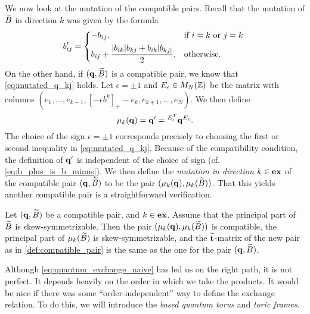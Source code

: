We now look at the mutation of the compatible pairs. Recall that the mutation of $\widetilde{B}$
in direction $k$ was given by the formula
\begin{equation*}
	b'_{ij} = \begin{dcases*}
		-b_{ij},                                            & if $i = k$ or $j = k$ \\
		b_{ij} + \frac{|b_{ik}|b_{kj} + b_{ik}|b_{kj|}}{2}, & otherwise.
	\end{dcases*}
\end{equation*}
%
On the other hand, if $(\mathbf{q}, \widetilde{B})$ is a compatible pair, we know that
\cref{eq:mutated_q_kj} holds. Let $\epsilon = \pm 1$ and $E_{\epsilon} \in M_N(\mathbb{Z})$
be the matrix with columns $(e_1, \dots, e_{k-1}, [-\epsilon b^k]_{+} - e_k, e_{k+1},
	\dots, e_N)$. We then define
\begin{equation}\label{eq:def_mutation_q}
	\mu_k(\mathbf{q}) = \mathbf{q}' = \prescript{E_{\epsilon}^T}{}{}\mathbf{q}^{E_\epsilon}.
\end{equation}
%
The choice of the sign $\epsilon = \pm 1$ corresponds precisely to choosing the first
or second inequality in \cref{eq:mutated_q_kj}. Because of the compatibility condition,
the definition of $\mathbf{q}'$ is independent of the choice of sign (cf.
\cref{eq:b_plus_is_b_minus}). We then define the \emph{mutation in direction $k \in
		\mathbf{ex}$} of the compatible pair $(\mathbf{q}, \widetilde{B})$ to be
the pair $(\mu_k (\mathbf{q}),\mu_k (\widetilde{B}) )$. That this yields another compatible pair is a
straightforward verification.
\begin{proposition}\label{prop:mutation_preserves_good_things}

	Let $(\mathbf{q}, \widetilde{B})$ be a compatible pair, and $k \in \mathbf{ex}$. Assume that the principal part
	of $\widetilde{B}$ is skew-symmetrizable. Then the pair $(\mu_k (\mathbf{q}), \mu_k(\widetilde{B}))$ is
	compatible, the principal part of $\mu_k(\widetilde{B})$ is skew-symmetrizable, and the
	$\widetilde{\mathbf{t}}$-matrix of the new pair as in \cref{def:compatible_pair} is the same as the
	one for the pair $(\mathbf{q}, \widetilde{B})$.
\end{proposition}

\medskip

Although \cref{eq:quantum_exchange_naive} has led us on the right path, it is not
perfect. It depends heavily on the order in which we take the products. It would be
nice if there was some ``order-independent'' way to define the exchange relation. To do
this, we will introduce the \emph{based quantum torus} and
\emph{toric frames}.

